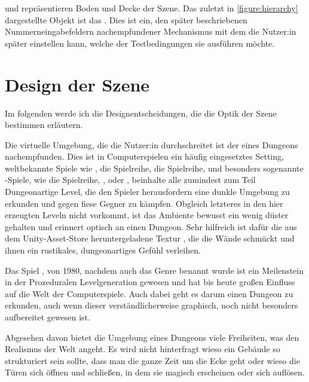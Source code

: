  und  repräsentieren Boden und Decke der Szene. Das zuletzt in \autoref{figure:hierarchy} dargestellte Objekt ist das . Dies ist ein, den später beschriebenen Nummerneingabefeldern nachempfundener Mechanismus mit dem die Nutzer:in später einstellen kann, welche der Testbedingungen sie ausführen möchte. %



\section{Design der Szene} \label{sec:scene-design}
Im folgenden werde ich die Designentscheidungen, die die Optik der Szene bestimmen erläutern.

Die virtuelle Umgebung, die die Nutzer:in durchschreitet ist der eines Dungeons nachempfunden. Dies ist in Computerspielen ein häufig eingesetztes Setting, weltbekannte Spiele wie
, %
die  Spielreihe,
die  Spielreihe,
und besonders sogenannte -Spiele, wie
die  Spielreihe,
,
oder , beinhalte alle zumindest zum Teil Dungeonartige Level, die den Spieler herausfordern eine dunkle Umgebung zu erkunden und gegen fiese Gegner zu kämpfen.
Obgleich letzteres in den hier erzeugten Leveln nicht vorkommt, ist das  Ambiente bewusst ein wenig düster gehalten und erinnert optisch an einen Dungeon. Sehr hilfreich ist dafür die aus dem Unity-Asset-Store heruntergeladene Textur \cite{dungeon-material}, die die Wände schmückt und ihnen ein rustikales, dungeonartiges Gefühl verleihen.

Das Spiel , von 1980, nachdem auch das Genre  benannt wurde ist ein Meilenstein in der Prozeduralen Levelgeneration gewesen und hat bis heute großen Einfluss auf die Welt der Computerspiele. Auch dabei geht es darum einen Dungeon zu erkunden, auch wenn dieser verständlicherweise graphisch, noch nicht besonders aufbereitet gewesen ist.

Abgesehen davon bietet die Umgebung eines Dungeons viele Freiheiten, was den Realismus der Welt angeht. Es wird nicht hinterfragt wieso ein Gebäude so strukturiert sein sollte, dass man die ganze Zeit um die Ecke geht oder wieso die Türen sich öffnen und schließen, in dem sie magisch erscheinen oder sich auflösen.

